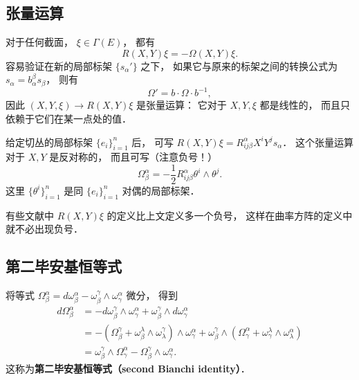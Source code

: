 \subsection{张量运算}
对于任何截面， $\xi\in\Gamma(E)$， 都有
$$
R(X,Y)\xi=-\Omega(X,Y)\xi.
$$
容易验证在新的局部标架 $\{s_\alpha'\}$ 之下， 如果它与原来的标架之间的转换公式为 $s_\alpha=b_\alpha^\beta s_\beta$， 则有
$$
\Omega'=b\cdot\Omega \cdot b^{-1},
$$
因此 $(X,Y,\xi)\to R(X,Y)\xi$ 是张量运算： 它对于 $X,Y,\xi$ 都是线性的， 而且只依赖于它们在某一点处的值． 

给定切丛的局部标架 $\{e_i\}_{i=1}^n$ 后， 可写 $R(X,Y)\xi=R^\alpha_{ij\beta}X^iY^js_\alpha$． 这个张量运算对于 $X,Y$ 是反对称的， 而且可写（注意负号！）
$$
\Omega_\beta^\alpha=-\frac{1}{2}R^\alpha_{ij\beta}\theta^i\wedge\theta^j.
$$
这里 $\{\theta^i\}_{i=1}^n$ 是同 $\{e_i\}_{i=1}^n$ 对偶的局部标架．

有些文献中 $R(X,Y)\xi$ 的定义比上文定义多一个负号， 这样在曲率方阵的定义中就不必出现负号．

\subsection{第二毕安基恒等式}
将等式 $\Omega_\beta^\alpha=d\omega_\beta^\alpha-\omega_\beta^\gamma\wedge\omega_\gamma^\alpha$ 微分， 得到
$$
\begin{aligned}
d\Omega_\beta^\alpha&=-d\omega_\beta^\gamma\wedge\omega_\gamma^\alpha+\omega_\beta^\gamma\wedge d\omega_\gamma^\alpha\\
&=-(\Omega_\beta^\gamma+\omega_\beta^\lambda\wedge\omega_\lambda^\gamma)\wedge\omega_\gamma^\alpha
+\omega_\beta^\gamma\wedge(\Omega_\gamma^\alpha+\omega_\gamma^\lambda\wedge\omega_\lambda^\alpha)\\
&=\omega_\beta^\gamma\wedge\Omega_\gamma^\alpha-\Omega_\beta^\gamma\wedge\omega_\gamma^\alpha.
\end{aligned}
$$
这称为\textbf{第二毕安基恒等式（second Bianchi identity）}．
